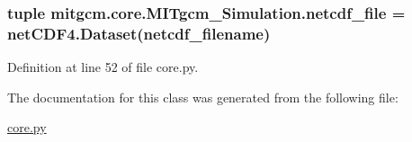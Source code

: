 \hypertarget{classmitgcm_1_1core_1_1MITgcm__Simulation_a801f2b7847cdd50c031f6f566e263189}{
\subsubsection[{netcdf\+\_\+file}]{\setlength{\rightskip}{0pt plus 5cm}tuple mitgcm.\+core.\+M\+I\+Tgcm\+\_\+\+Simulation.\+netcdf\+\_\+file = net\+C\+D\+F4.\+Dataset(netcdf\+\_\+filename)\hspace{0.3cm}{\ttfamily [static]}}}\label{classmitgcm_1_1core_1_1MITgcm__Simulation_a801f2b7847cdd50c031f6f566e263189}


Definition at line 52 of file core.\+py.



The documentation for this class was generated from the following file\+:\begin{DoxyCompactItemize}
\item 
\hyperlink{core_8py}{core.\+py}\end{DoxyCompactItemize}
